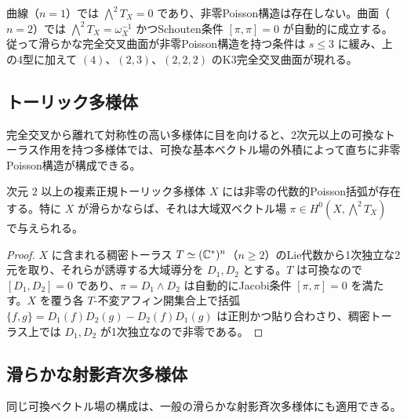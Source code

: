 \begin{remark}\label{rem:ci-small-dimension}
曲線（$n=1$）では $\bigwedge^2T_X=0$ であり、非零Poisson構造は存在しない。曲面（$n=2$）では $\bigwedge^2T_X=\omega_X^{-1}$ かつSchouten条件 $[\pi,\pi]=0$ が自動的に成立する。従って滑らかな完全交叉曲面が非零Poisson構造を持つ条件は $s\le3$ に緩み、上の4型に加えて $(4)$、$(2,3)$、$(2,2,2)$ のK3完全交叉曲面が現れる。
\end{remark}

\subsection{トーリック多様体}
完全交叉から離れて対称性の高い多様体に目を向けると、2次元以上の可換なトーラス作用を持つ多様体では、可換な基本ベクトル場の外積によって直ちに非零Poisson構造が構成できる。

\begin{proposition}\label{prop:toric-poisson}
次元 $2$ 以上の複素正規トーリック多様体 $X$ には非零の代数的Poisson括弧が存在する。特に $X$ が滑らかならば、それは大域双ベクトル場 $\pi\in H^0(X,\bigwedge^2T_X)$ で与えられる。
\end{proposition}
\begin{proof}
$X$ に含まれる稠密トーラス $T\simeq(\mathbb C^*)^n$（$n\ge2$）のLie代数から1次独立な2元を取り、それらが誘導する大域導分を $D_1,D_2$ とする。$T$ は可換なので $[D_1,D_2]=0$ であり、$\pi=D_1\wedge D_2$ は自動的にJacobi条件 $[\pi,\pi]=0$ を満たす。$X$ を覆う各 $T$-不変アフィン開集合上で括弧 $\{f,g\}=D_1(f)D_2(g)-D_2(f)D_1(g)$ は正則かつ貼り合わさり、稠密トーラス上では $D_1,D_2$ が1次独立なので非零である。
\end{proof}

\subsection{滑らかな射影斉次多様体}
同じ可換ベクトル場の構成は、一般の滑らかな射影斉次多様体にも適用できる。

